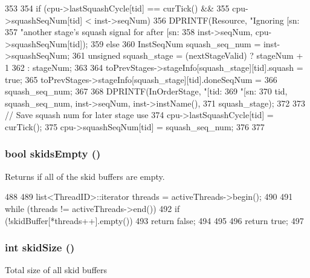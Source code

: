 \begin{DoxyCode}
353 {
354     if (cpu->lastSquashCycle[tid] == curTick() &&
355         cpu->squashSeqNum[tid] < inst->seqNum){
356         DPRINTF(Resource, "Ignoring [sn:%
357                 "another stage's squash signal for after [sn:%
358                 inst->seqNum, cpu->squashSeqNum[tid]);
359     } else {
360         InstSeqNum squash_seq_num = inst->squashSeqNum;
361         unsigned squash_stage = (nextStageValid) ? stageNum + 1
362             : stageNum;
363 
364         toPrevStages->stageInfo[squash_stage][tid].squash = true;
365         toPrevStages->stageInfo[squash_stage][tid].doneSeqNum =
366             squash_seq_num;
367 
368         DPRINTF(InOrderStage, "[tid:%
369                 "[sn:%
370                 tid, squash_seq_num, inst->seqNum, inst->instName(),
371                 squash_stage);
372 
373         // Save squash num for later stage use
374         cpu->lastSquashCycle[tid] = curTick();
375         cpu->squashSeqNum[tid] = squash_seq_num;
376     }
377 }
\end{DoxyCode}
\hypertarget{classPipelineStage_afe3e2673d17dd5c568862ef5ae68b4d8}{
\subsubsection[{skidsEmpty}]{\setlength{\rightskip}{0pt plus 5cm}bool skidsEmpty ()}}
\label{classPipelineStage_afe3e2673d17dd5c568862ef5ae68b4d8}
Returns if all of the skid buffers are empty. 


\begin{DoxyCode}
488 {
489     list<ThreadID>::iterator threads = activeThreads->begin();
490 
491     while (threads != activeThreads->end()) {
492         if (!skidBuffer[*threads++].empty())
493             return false;
494     }
495 
496     return true;
497 }
\end{DoxyCode}
\hypertarget{classPipelineStage_a112431820c072831aa16794d42dc25e4}{
\subsubsection[{skidSize}]{\setlength{\rightskip}{0pt plus 5cm}int skidSize ()}}
\label{classPipelineStage_a112431820c072831aa16794d42dc25e4}
Total size of all skid buffers 


